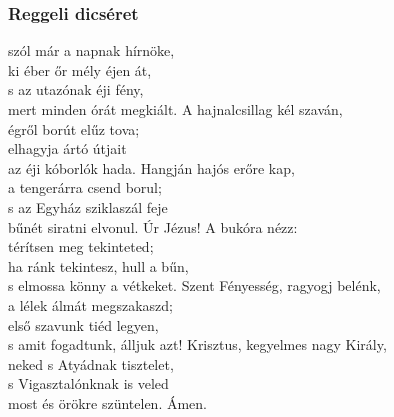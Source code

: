 \documentclass[twoside]{article}
\begin{document}




\subsubsection*{Reggeli dicséret}



\begin{hymnstanzas}
    szól már a napnak hírnöke,\\
    ki éber őr mély éjen át,\\
    s az utazónak éji fény,\\
    mert minden órát megkiált.
\stanzabreak
    A hajnalcsillag kél szaván,\\
    égről borút elűz tova;\\
    elhagyja ártó útjait\\
    az éji kóborlók hada.
\stanzabreak
    Hangján hajós erőre kap,\\
    a tengerárra csend borul;\\
    s az Egyház sziklaszál feje\\
    bűnét siratni elvonul.
\stanzabreak
    Úr Jézus! A bukóra nézz:\\
    térítsen meg tekinteted;\\
    ha ránk tekintesz, hull a bűn,\\
    s elmossa könny a vétkeket.
\stanzabreak
    Szent Fényesség, ragyogj belénk,\\
    a lélek álmát megszakaszd;\\
    első szavunk tiéd legyen,\\
    s amit fogadtunk, álljuk azt!
\stanzabreak
    Krisztus, kegyelmes nagy Király,\\
    neked s Atyádnak tisztelet,\\
    s Vigasztalónknak is veled\\
    most és örökre szüntelen. Ámen.
\end{hymnstanzas}
\end{document}

